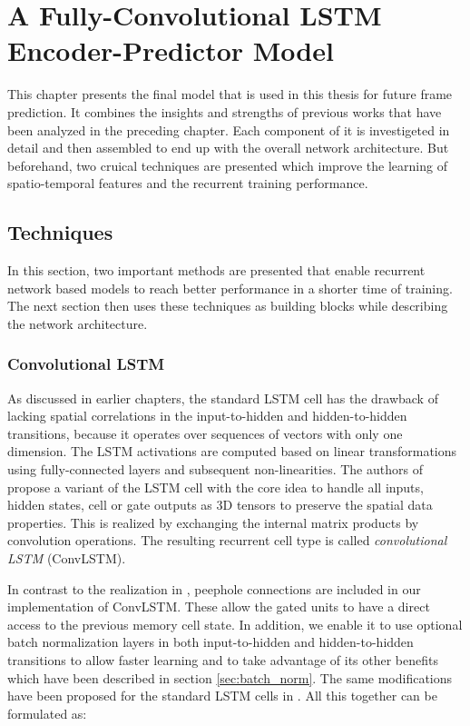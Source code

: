 
\chapter{A Fully-Convolutional LSTM Encoder-Predictor Model} \label{chapter:implementation}

This chapter presents the final model that is used in this thesis for future frame prediction. It combines the insights and strengths of previous works that have been analyzed in the preceding chapter. Each component of it is investigeted in detail and then assembled to end up with the overall network architecture. But beforehand, two cruical techniques are presented which improve the learning of spatio-temporal features and the recurrent training performance.

\section{Techniques}

In this section, two important methods are presented that enable recurrent network based models to reach better performance in a shorter time of training. The next section then uses these techniques as building blocks while describing the network architecture.

\subsection{Convolutional LSTM} \label{sec:conv_lstm}

As discussed in earlier chapters, the standard LSTM cell has the drawback of lacking spatial correlations in the input-to-hidden and hidden-to-hidden transitions, because it operates over sequences of vectors with only one dimension. The LSTM activations are computed based on linear transformations using fully-connected layers and subsequent non-linearities. The authors of \parencite{conv_lstm_nowcasting} propose a variant of the LSTM cell with the core idea to handle all inputs, hidden states, cell or gate outputs as 3D tensors to preserve the spatial data properties. This is realized by exchanging the internal matrix products by convolution operations. The resulting recurrent cell type is called \textit{convolutional LSTM} (ConvLSTM).

In contrast to the realization in \parencite{spat_temp_video_autoenc}, peephole connections are included in our implementation of ConvLSTM. These allow the gated units to have a direct access to the previous memory cell state. In addition, we enable it to use optional batch normalization layers in both input-to-hidden and hidden-to-hidden transitions to allow faster learning and to take advantage of its other benefits which have been described in section \ref{sec:batch_norm}. The same modifications have been proposed for the standard LSTM cells in \parencite{rnn-batchnorm}. All this together can be formulated as:

